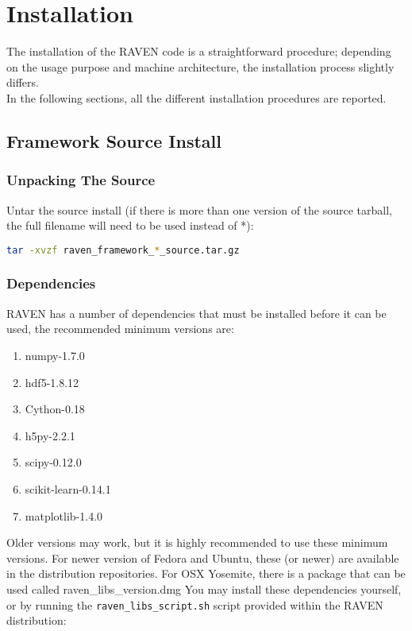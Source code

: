 \section{Installation}
The installation of the RAVEN code is a straightforward procedure; depending on the usage purpose
and machine architecture, the installation process slightly differs. \\In the following sections, all the different
installation procedures are reported.

\subsection{Framework Source Install}

\subsubsection{Unpacking The Source}

Untar the source install (if there is more than one version of the
source tarball, the full filename will need to be used instead of *):

\begin{lstlisting}[language=bash]
tar -xvzf raven_framework_*_source.tar.gz
\end{lstlisting}

\subsubsection{Dependencies}
\label{raven_dependencies}
RAVEN has a number of dependencies that must be installed before it can be used,
the recommended minimum versions are:

\begin{enumerate}
\item numpy-1.7.0
\item hdf5-1.8.12
\item Cython-0.18
\item h5py-2.2.1
\item scipy-0.12.0
\item scikit-learn-0.14.1
\item matplotlib-1.4.0
\end{enumerate}

Older versions may work, but it is highly recommended to use these
minimum versions.  For newer version of Fedora and Ubuntu, these (or
newer) are available in the distribution repositories.  For OSX
Yosemite, there is a package that can be used called
raven\_libs\_version.dmg
%
You may install these dependencies yourself, or by running the
\texttt{raven\_libs\_script.sh} script provided within the RAVEN distribution:

